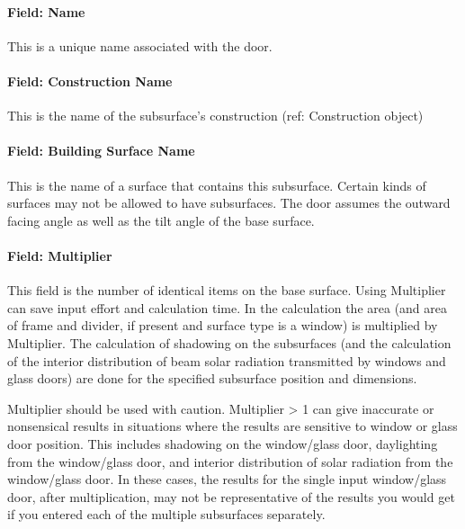 \paragraph{Field: Name}\label{field-name-11-015}

This is a unique name associated with the door.

\paragraph{Field: Construction Name}\label{field-construction-name-11}

This is the name of the subsurface's construction (ref: Construction object)

\paragraph{Field: Building Surface Name}\label{field-building-surface-name-1}

This is the name of a surface that contains this subsurface. Certain kinds of surfaces may not be allowed to have subsurfaces. The door assumes the outward facing angle as well as the tilt angle of the base surface.

\paragraph{Field: Multiplier}\label{field-multiplier-2}

This field is the number of identical items on the base surface. Using Multiplier can save input effort and calculation time. In the calculation the area (and area of frame and divider, if present and surface type is a window) is multiplied by Multiplier. The calculation of shadowing on the subsurfaces (and the calculation of the interior distribution of beam solar radiation transmitted by windows and glass doors) are done for the specified subsurface position and dimensions.

Multiplier should be used with caution. Multiplier \textgreater{} 1 can give inaccurate or nonsensical results in situations where the results are sensitive to window or glass door position. This includes shadowing on the window/glass door, daylighting from the window/glass door, and interior distribution of solar radiation from the window/glass door. In these cases, the results for the single input window/glass door, after multiplication, may not be representative of the results you would get if you entered each of the multiple subsurfaces separately.

